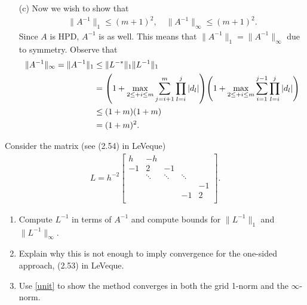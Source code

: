 \documentclass[12pt]{report}
\begin{document}
\begin{solution}
\begin{enumerate}
      \item [(c)]
      Now we wish to show that 
      \begin{align*}
        \|A^{-1}\|_1 \leq (m+1)^2, \quad \|A^{-1}\|_\infty \leq (m+1)^2.
      \end{align*}
      Since $A$ is HPD, $A^{-1}$ is as well. This means that $\|A^{-1}\|_1 = \|A^{-1}\|_\infty$ due to symmetry. Observe that
      \begin{align*}
        \|A^{-1}\|_\infty = \|A^{-1}\|_1 &\leq \| L^{-*} \|_1 \| L^{-1} \|_1\\
         &= {\left(1 + \max_{2 \leq + i \leq m} \sum^m_{j = i +1} \prod_{l = i}^{j} |d_l|\right)}{\left(1 + \max_{2 \leq + i \leq m} \sum^{j-1}_{i = 1} \prod_{l = i}^{j} |d_l|\right)}\\
         &\leq (1 + m)(1 + m)\\
        &= (1 + m)^2.
      \end{align*}


    \end{enumerate}
\end{solution}

\newpage



\begin{problem}
    Consider the matrix (see (2.54) in LeVeque)
    \begin{align*}
      L = h^{-2} \begin{bmatrix} h & -h \\ -1 & 2 &-1 \\  
    & \ddots & \ddots & \ddots \\
    &&&& -1\\
    &&&-1& 2\\
  \end{bmatrix}.\end{align*}
\begin{enumerate}
  \item Compute $L^{-1}$ in terms of $A^{-1}$ and compute bounds for  $\|L^{-1}\|_1$ and $\|L^{-1}\|_\infty$.
  \item Explain why this is not enough to imply convergence for the one-sided approach, (2.53) in LeVeque.
    \item Use \eqref{unit} to show the method converges in both the grid 1-norm and the $\infty$-norm.
  \end{enumerate}
\end{problem}
\end{document}
